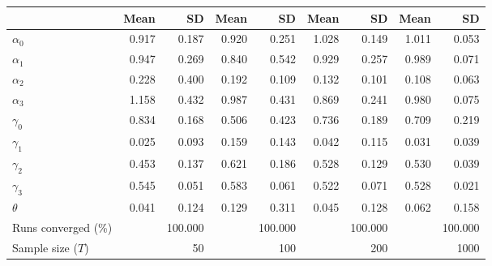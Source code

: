 
\begin{tabular}[t]{lrrrrrrrr}
\toprule
  & Mean & SD & Mean  & SD  & Mean   & SD   & Mean    & SD   \\
\midrule
$\alpha_{0}$ & 0.917 & 0.187 & 0.920 & 0.251 & 1.028 & 0.149 & 1.011 & 0.053\\
$\alpha_{1}$ & 0.947 & 0.269 & 0.840 & 0.542 & 0.929 & 0.257 & 0.989 & 0.071\\
$\alpha_{2}$ & 0.228 & 0.400 & 0.192 & 0.109 & 0.132 & 0.101 & 0.108 & 0.063\\
$\alpha_{3}$ & 1.158 & 0.432 & 0.987 & 0.431 & 0.869 & 0.241 & 0.980 & 0.075\\
$\gamma_{0}$ & 0.834 & 0.168 & 0.506 & 0.423 & 0.736 & 0.189 & 0.709 & 0.219\\
$\gamma_{1}$ & 0.025 & 0.093 & 0.159 & 0.143 & 0.042 & 0.115 & 0.031 & 0.039\\
$\gamma_{2}$ & 0.453 & 0.137 & 0.621 & 0.186 & 0.528 & 0.129 & 0.530 & 0.039\\
$\gamma_{3}$ & 0.545 & 0.051 & 0.583 & 0.061 & 0.522 & 0.071 & 0.528 & 0.021\\
$\theta$ & 0.041 & 0.124 & 0.129 & 0.311 & 0.045 & 0.128 & 0.062 & 0.158\\
Runs converged (\%) &  & 100.000 &  & 100.000 &  & 100.000 &  & 100.000\\
Sample size ($T$) &  & 50 &  & 100 &  & 200 &  & 1000\\
\bottomrule
\end{tabular}
